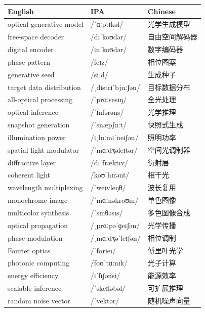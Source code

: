 \documentclass[UTF8,12pt,a4paper]{ctexart}
\providecommand{\zh}[1]{#1}
\begin{document}
\begin{tabular*}{\textwidth}{@{\extracolsep{\fill}}lll@{}}
\toprule
\textbf{English} & \textbf{IPA} & \textbf{Chinese} \\
\midrule
optical generative model & {\ipafont /ˈɑːptɪkəl/} & \zh{光学生成模型} \\
free-space decoder & {\ipafont /dɪˈkoʊdər/} & \zh{自由空间解码器} \\
digital encoder & {\ipafont /ɪnˈkoʊdər/} & \zh{数字编码器} \\
phase pattern & {\ipafont /feɪz/} & \zh{相位图案} \\
generative seed & {\ipafont /siːd/} & \zh{生成种子} \\
target data distribution & {\ipafont /ˌdɪstrɪˈbjuːʃən/} & \zh{目标数据分布} \\
all-optical processing & {\ipafont /ˈprɑːsesɪŋ/} & \zh{全光处理} \\
optical inference & {\ipafont /ˈɪnfərəns/} & \zh{光学推理} \\
snapshot generation & {\ipafont /ˈsnæpʃɑːt/} & \zh{快照式生成} \\
illumination power & {\ipafont /ɪˌluːmɪˈneɪʃən/} & \zh{照明功率} \\
spatial light modulator & {\ipafont /ˈmɑːdʒəleɪtər/} & \zh{空间光调制器} \\
diffractive layer & {\ipafont /dɪˈfræktɪv/} & \zh{衍射层} \\
coherent light & {\ipafont /koʊˈhɪrənt/} & \zh{相干光} \\
wavelength multiplexing & {\ipafont /ˈweɪvleŋθ/} & \zh{波长复用} \\
monochrome image & {\ipafont /ˈmɑːnəkroʊm/} & \zh{单色图像} \\
multicolor synthesis & {\ipafont /ˈsɪnθəsɪs/} & \zh{多色图像合成} \\
optical propagation & {\ipafont /ˌprɑːpəˈɡeɪʃən/} & \zh{光学传播} \\
phase modulation & {\ipafont /ˌmɑːdʒəˈleɪʃən/} & \zh{相位调制} \\
Fourier optics & {\ipafont /ˈfʊrieɪ/} & \zh{傅里叶光学} \\
photonic computing & {\ipafont /foʊˈtɑːnɪk/} & \zh{光子计算} \\
energy efficiency & {\ipafont /ɪˈfɪʃənsi/} & \zh{能源效率} \\
scalable inference & {\ipafont /ˈskeɪləbəl/} & \zh{可扩展推理} \\
random noise vector & {\ipafont /ˈvektər/} & \zh{随机噪声向量} \\

\end{tabular*}
\end{document}

